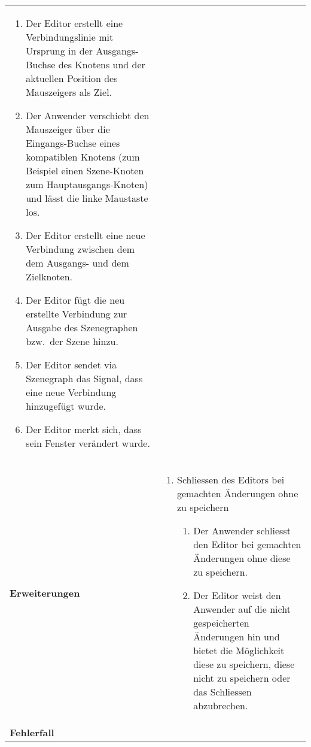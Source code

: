 \begin{longtabu}{p{0.5\textwidth}p{0.5\textwidth}}
\begin{enumerate}
{                    linke Maustaste gedrückt.}
                \item{Der Editor erstellt eine Verbindungslinie mit
                        Ursprung in der Ausgangs-Buchse des Knotens und der
                        aktuellen Position des Mauszeigers als Ziel.}
            \item{Der Anwender verschiebt den Mauszeiger über die
                    Eingangs-Buchse eines kompatiblen Knotens (zum Beispiel
                    einen Szene-Knoten zum Hauptausgangs-Knoten) und lässt
                    die linke Maustaste los.}
            \item{Der Editor erstellt eine neue Verbindung zwischen dem
                    dem Ausgangs- und dem Zielknoten.}
            \item{Der Editor fügt die neu erstellte Verbindung zur Ausgabe des
                    Szenegraphen bzw.\ der Szene hinzu.}
            \item{Der Editor sendet via Szenegraph das Signal, dass eine
                    neue Verbindung hinzugefügt wurde.}
            \item{Der Editor merkt sich, dass sein Fenster verändert
                    wurde.}
        \end{enumerate} \\
    \cmidrule(r){1-1}\cmidrule(lr){2-2}
        \textbf{Erweiterungen} &
        \begin{enumerate}[label= (\alph*)]
            \item{Schliessen des Editors bei gemachten Änderungen ohne zu
                    speichern
                \begin{enumerate}[label= (\roman*)]
                    \item{Der Anwender schliesst den Editor bei gemachten
                            Änderungen ohne diese zu speichern.}
                    \item{Der Editor weist den Anwender auf die
                            nicht gespeicherten Änderungen hin und bietet
                            die Möglichkeit diese zu speichern, diese nicht
                            zu speichern oder das Schliessen abzubrechen.}
                \end{enumerate}
            }
        \end{enumerate}\\
    \cmidrule(r){1-1}\cmidrule(lr){2-2}
        \textbf{Fehlerfall} &
        \begin{enumerate}[label= (\alph*)]

\end{enumerate}
\end{longtabu}
